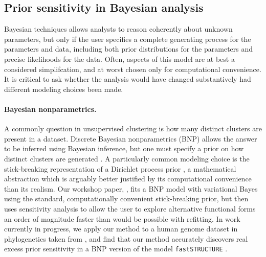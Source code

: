 \subsection*{Prior sensitivity in Bayesian analysis}

Bayesian techniques allows analysts to reason coherently about unknown
parameters, but only if the user specifies a complete generating process for the
parameters and data, including both prior distributions for the parameters and
precise likelihoods for the data.  Often, aspects of this model are at best a
considered simplifcation, and at worst chosen only for computational
convenience.  It is critical to ask whether the analysis would have changed
substantively had different modeling choices been made.

\paragraph{Bayesian nonparametrics.}

A commonly question in unsupervised clustering is how many distinct clusters are
present in a dataset.  Discrete Bayesian nonparametrics (BNP) allows the answer
to be inferred using Bayesian inference, but one must specify a prior on how
distinct clusters are generated \citep{ghosh:2003:bnp,
gershman:2012:bnptutorial}.  A particularly common modeling choice is the
stick-breaking representation of a Dirichlet process prior
\citep{sethuraman:1994:constructivedp}, a mathematical abstraction which is
arguably better justified by its computational convenience than its realism. Our
workshop paper, \citet{giordano:2018:bnpsensitivity}, fits a BNP model with
variational Bayes \citep{blei:2006:dirichletbnp} using the standard,
computationally convenient stick-breaking prior, but then uses sensitivity
analysis to allow the user to explore alternative functional forms an order of
magnitude faster than would be possible with refitting. In work currently in
progress, we apply our method to a human genome dataset in phylogenetics taken
from \citep{huang:2011:haplotype}, and find that our method accurately discovers
real excess prior sensitivity in a BNP version of the model
\texttt{fastSTRUCTURE} \citep{raj:2014:faststructure}.


